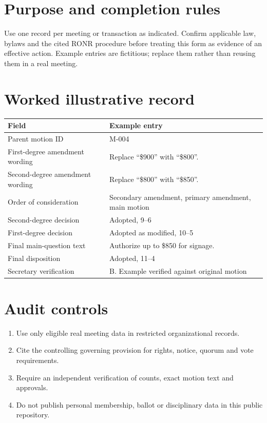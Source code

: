 \documentclass[11pt]{article}
\begin{document}
\SuiteOpen
\section{Purpose and completion rules}
Use one record per meeting or transaction as indicated. Confirm applicable law, bylaws and the cited RONR procedure before treating this form as evidence of an effective action. Example entries are fictitious; replace them rather than reusing them in a real meeting.

\section{Worked illustrative record}
\begin{longtable}{@{}p{.38\linewidth}p{.55\linewidth}@{}}\toprule Field & Example entry\\\midrule\endhead


Parent motion ID & M-004\\
First-degree amendment wording & Replace “\$900” with “\$800”.\\
Second-degree amendment wording & Replace “\$800” with “\$850”.\\
Order of consideration & Secondary amendment, primary amendment, main motion\\
Second-degree decision & Adopted, 9–6\\
First-degree decision & Adopted as modified, 10–5\\
Final main-question text & Authorize up to \$850 for signage.\\
Final disposition & Adopted, 11–4\\
Secretary verification & B. Example verified against original motion\\
\bottomrule\end{longtable}
\section{Audit controls}
\begin{enumerate}[leftmargin=*,itemsep=4pt]
\item Use only eligible real meeting data in restricted organizational records.
\item Cite the controlling governing provision for rights, notice, quorum and vote requirements.
\item Require an independent verification of counts, exact motion text and approvals.
\item Do not publish personal membership, ballot or disciplinary data in this public repository.
\end{enumerate}
\end{document}
